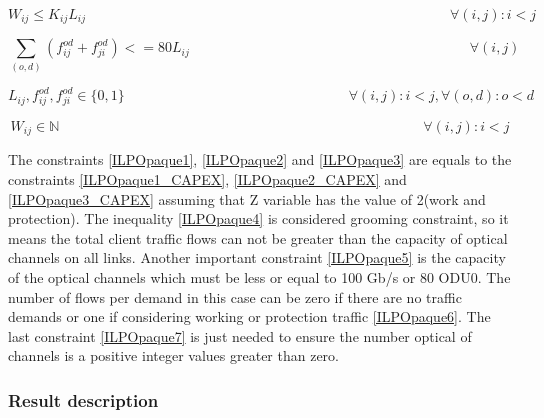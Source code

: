 \begin{equation}
W_{ij} \leq K_{ij} L_{ij} \qquad  \qquad \qquad \qquad \qquad \qquad \qquad \qquad \qquad \qquad \qquad \qquad \qquad \forall(i,j) : i < j
\label{ILPOpaque5}
\end{equation}

\begin{equation}
\sum_{(o,d)} \left(f_{ij}^{od} + f_{ji}^{od}\right)<= 80 L_{ij} \qquad \qquad \qquad \qquad \qquad \qquad \qquad \qquad \qquad \qquad
\forall (i,j)
\label{ILPOpaqueX}
\end{equation}

\begin{equation}
L_{ij} , f_{ij}^{od} , f_{ji}^{od} \in \{0,1\}   \qquad \qquad \qquad \qquad \qquad \qquad \qquad \qquad
\forall(i,j) : i < j, \forall(o,d) : o < d
\label{ILPOpaque6}
\end{equation}

\begin{equation}
W_{ij} \in \mathbb{N}  \qquad \qquad \qquad \qquad \qquad \qquad \qquad \qquad \qquad \qquad \qquad \qquad \qquad
\forall(i,j) : i < j\label{ILPOpaque7}
\end{equation}

\vspace{10pt}

The constraints \ref{ILPOpaque1}, \ref{ILPOpaque2} and \ref{ILPOpaque3} are equals to the constraints \ref{ILPOpaque1_CAPEX}, \ref{ILPOpaque2_CAPEX} and \ref{ILPOpaque3_CAPEX} assuming that Z variable has the value of 2(work and protection).
The inequality \ref{ILPOpaque4} is considered grooming constraint, so it means the total client traffic flows can not be greater than the capacity of optical channels on all links. Another important constraint \ref{ILPOpaque5} is the capacity of the optical channels which must be less or equal to 100 Gb/s or 80 ODU0. The number of flows per demand in this case can be zero if there are no traffic demands or one if considering working or protection traffic \ref{ILPOpaque6}. The last constraint \ref{ILPOpaque7} is just needed to ensure the number optical of channels is a positive integer values greater than zero.\\

\subsubsection{Result description}

